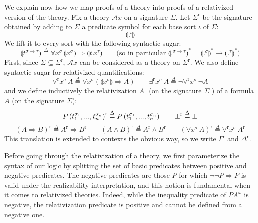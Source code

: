 \documentclass{CSML}
\renewcommand{\ldots}{...}
\newcommand*\Def{\mathrel{\overset{\Delta}{=}}}
\newcommand*\SortBase\iota
\newcommand*\SortTo\to
\newcommand*\SortA{\sigma}
\newcommand*\SortB{\tau}
\newcommand*\LogSortedTerm[2]{#1^{#2}}
\newcommand*\LogTermA{t}
\newcommand*\LogVarA{x}
\newcommand*\LogImp{\mathbin{\Rightarrow}}
\newcommand*\LogAnd{\mathbin{\wedge}}
\newcommand*\LogBot\bot
\newcommand*\LogRel[1]{\llparenthesis#1\rrparenthesis}
\newcommand*\LogRelForm[1]{{#1^\mathrm{r}}}
\newcommand*\LogForallRel{\forall^\mathrm{r}}
\newcommand*\LogExistsRel{\exists^\mathrm{r}}
\newcommand*\LogFormA{A}
\newcommand*\LogFormB{B}
\newcommand*\LogAxioms{\mathcal{A}x}
\newcommand*\LogPredA{P}
\newcommand*\LmSortTo\to
\newcommand*\LmInterpForm[1]{{#1}^*}
\newcommand*\PA{{P\!A}}
\newcommand*\PAom{{\PA^\omega}}
\begin{document}
We explain now how we map proofs of a theory into proofs of a relativized version of the theory. Fix a theory $\LogAxioms$ on a signature $\Sigma$. Let $\LogRelForm{\Sigma}$ be the signature obtained by adding to $\Sigma$ a predicate symbol for each base sort $\SortBase$ of $\Sigma$:
$$\LogRel{\LogSortedTerm{.}{\SortBase}}$$
We lift it to every sort with the following syntactic sugar:
$$\LogRel{\LogSortedTerm{\LogTermA}{\SortA\SortTo\SortB}}\Def\forall\LogSortedTerm{\LogVarA}{\SortA}\,\LogRel{\LogSortedTerm{\LogVarA}{\SortA}}\LogImp\LogRel{\LogSortedTerm{\LogTermA\,\LogVarA}{\SortB}}\qquad\text{(so in particular }\LmInterpForm{\LogRel{\LogSortedTerm{.}{\SortA\SortTo\SortB}}}=\LmInterpForm{\LogRel{\LogSortedTerm{.}{\SortA}}}\LmSortTo\LmInterpForm{\LogRel{\LogSortedTerm{.}{\SortB}}}\text{)}$$
First, since $\Sigma\subseteq\LogRelForm{\Sigma}$, $\LogAxioms$ can be considered as a theory on $\LogRelForm{\Sigma}$. We also define syntactic sugar for relativized quantifications:
$$\LogForallRel\LogSortedTerm{\LogVarA}{\SortA}\,\LogFormA\Def\forall\LogSortedTerm{\LogVarA}{\SortA}\left(\LogRel{\LogSortedTerm{\LogVarA}{\SortA}}\LogImp\LogFormA\right)\qquad\LogExistsRel\LogSortedTerm{\LogVarA}{\SortA}\,\LogFormA\Def\neg\LogForallRel\LogSortedTerm{\LogVarA}{\SortA}\,\neg\LogFormA$$
and we define inductively the relativization $\LogRelForm{\LogFormA}$ (on the signature $\LogRelForm{\Sigma}$) of a formula $\LogFormA$ (on the signature $\Sigma$):
$$\LogRelForm{\LogPredA\left(\LogSortedTerm{\LogTermA_1}{\SortA_1},\ldots,\LogSortedTerm{\LogTermA_n}{\SortA_n}\right)}\Def\LogPredA\left(\LogSortedTerm{\LogTermA_1}{\SortA_1},\ldots,\LogSortedTerm{\LogTermA_n}{\SortA_n}\right)\qquad\LogRelForm{\LogBot}\Def\LogBot\\$$
$$\LogRelForm{\left(\LogFormA\LogImp\LogFormB\right)}\Def\LogRelForm{\LogFormA}\LogImp\LogRelForm{\LogFormB}\qquad\LogRelForm{\left(\LogFormA\LogAnd\LogFormB\right)}\Def\LogRelForm{\LogFormA}\LogAnd\LogRelForm{\LogFormB}\qquad\LogRelForm{\left(\forall\LogSortedTerm{\LogVarA}{\SortA}\,\LogFormA\right)}\Def\LogForallRel\LogSortedTerm{\LogVarA}{\SortA}\,\LogRelForm{\LogFormA}$$
This translation is extended to contexts the obvious way, so we write $\LogRelForm{\Gamma}$ and $\LogRelForm{\Delta}$.\par
Before going through the relativization of a theory, we first parameterize the syntax of our logic by splitting the set of basic predicates between positive and negative predicates. The negative predicates are those $\LogPredA$ for which $\neg\neg\LogPredA\LogImp\LogPredA$ is valid under the realizability interpretation, and this notion is fundamental when it comes to relativized theories. Indeed, while the inequality predicate of $\PAom$ is negative, the relativization predicate is positive and cannot be defined from a negative one.\par
\end{document}
